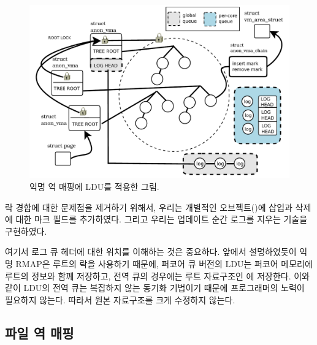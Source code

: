 \begin{figure}[tb]
  \begin{center}
     \includegraphics[width=1\textwidth,height=1\textheight,keepaspectratio]{fig/anon_vma}
  \end{center}
  \caption{익명 역 매핑에 LDU를 적용한 그림.}
  \label{fig:anonvmaramp}
\end{figure}

락 경합에 대한 문제점을 제거하기 위해서, 우리는 개별적인 오브젝트()에 
삽입과 삭제에 대한 마크 필드를 추가하였다. 
그리고 우리는 업데이트 순간 로그를 지우는 기술을 구현하였다.

여기서 로그 큐 헤더에 대한 위치를 이해하는 것은 중요하다.
앞에서 설명하였듯이 익명 RMAP은 루트의 락을 사용하기 때문에, 퍼코어 큐 버전의 LDU는 
퍼코어 메모리에 루트의 정보와 함께 저장하고, 전역 큐의 경우에는 루트 자료구조인 에 
저장한다. 
이와 같이 LDU의 전역 큐는 복잡하지 않는 동기화 기법이기 때문에 프로그래머의 노력이 필요하지 않는다.
따라서 원본 자료구조를 크게 수정하지 않는다. 

\subsection{파일 역 매핑}

